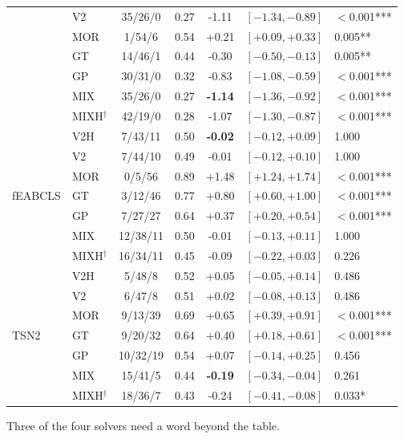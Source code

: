 \documentclass[review]{elsarticle}
\begin{document}
\begin{table}[htbp]
\begin{tabular}{llccc l l}
 & V2             & 35/26/0 & 0.27 & -1.11 & $[-1.34,-0.89]$ & $<$0.001*** \\
 & MOR            & 1/54/6 & 0.54 & +0.21 & $[+0.09,+0.33]$ & 0.005** \\
 & GT             & 14/46/1 & 0.44 & -0.30 & $[-0.50,-0.13]$ & 0.005** \\
 & GP             & 30/31/0 & 0.32 & -0.83 & $[-1.08,-0.59]$ & $<$0.001*** \\
 & MIX            & 35/26/0 & 0.27 & \textbf{-1.14} & $[-1.36,-0.92]$ & $<$0.001*** \\
 & MIXH$^{\dagger}$ & 42/19/0 & 0.28 & -1.07 & $[-1.30,-0.87]$ & $<$0.001*** \\
\midrule
\multirow{7}{*}{fEABCLS}
 & V2H            & 7/43/11 & 0.50 & \textbf{-0.02} & $[-0.12,+0.09]$ & 1.000 \\
 & V2             & 7/44/10 & 0.49 & -0.01 & $[-0.12,+0.10]$ & 1.000 \\
 & MOR            & 0/5/56 & 0.89 & +1.48 & $[+1.24,+1.74]$ & $<$0.001*** \\
 & GT             & 3/12/46 & 0.77 & +0.80 & $[+0.60,+1.00]$ & $<$0.001*** \\
 & GP             & 7/27/27 & 0.64 & +0.37 & $[+0.20,+0.54]$ & $<$0.001*** \\
 & MIX            & 12/38/11 & 0.50 & -0.01 & $[-0.13,+0.11]$ & 1.000 \\
 & MIXH$^{\dagger}$ & 16/34/11 & 0.45 & -0.09 & $[-0.22,+0.03]$ & 0.226 \\
\midrule
\multirow{7}{*}{TSN2}
 & V2H            & 5/48/8 & 0.52 & +0.05 & $[-0.05,+0.14]$ & 0.486 \\
 & V2             & 6/47/8 & 0.51 & +0.02 & $[-0.08,+0.13]$ & 0.486 \\
 & MOR            & 9/13/39 & 0.69 & +0.65 & $[+0.39,+0.91]$ & $<$0.001*** \\
 & GT             & 9/20/32 & 0.64 & +0.40 & $[+0.18,+0.61]$ & $<$0.001*** \\
 & GP             & 10/32/19 & 0.54 & +0.07 & $[-0.14,+0.25]$ & 0.456 \\
 & MIX            & 15/41/5 & 0.44 & \textbf{-0.19} & $[-0.34,-0.04]$ & 0.261 \\
 & MIXH$^{\dagger}$ & 18/36/7 & 0.43 & -0.24 & $[-0.41,-0.08]$ & 0.033* \\
\bottomrule
\end{tabular}
\end{table}

Three of the four solvers need a word beyond the table.
\end{document}
